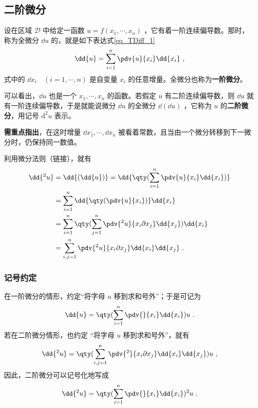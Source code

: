 \subsection{二阶微分}
设在区域 $\mathcal{D}$ 中给定一函数 $u=f(x_1,\cdots,x_n)$ ，它有着一阶连续偏导数。那时，称为全微分 $\dd{u}$ 的，就是如下表达式\autoref{eq_TDiff_1}~
\begin{equation}
\dd{u}=\sum_{i=1}^n \pdv{u}{x_i}\dd{x_i}~,
\end{equation}
式中的 $\dd{x_i}\quad(i=1,\cdots,n)$ 是自变量 $x_i$ 的任意增量。全微分也称为\textbf{一阶微分}。

可以看出，$\dd{u}$ 也是一个 $x_1,\cdots,x_n$ 的函数。若假定 $u$ 有二阶连续偏导数，则 $\dd{u}$ 就有一阶连续偏导数，于是就能说微分 $\dd{u}$ 的全微分 $\dd{(\dd u)}$ ，它称为 $u$ 的\textbf{二阶微分}，用记号 $\mathrm{d}^2u$ 表示。

\textbf{需重点指出}，在这时增量 $\dd{x_1},\cdots,\dd{x_n}$ 被看着常数，且当由一个微分转移到下一微分时，仍保持同一数值。

利用微分法则（链接），就有
\begin{equation}
\begin{aligned}
\dd{^2u}&=\dd{(\dd{u})}=\dd{\qty(\sum_{i=1}^n \pdv{u}{x_i}\dd{x_i})}\\
&=\sum_{i=1}^n \dd{\qty(\pdv{u}{x_i})}\dd{x_i}\\
&=\sum_{i=1}^n\qty(\sum_{j=1}^n\pdv{^2u}{x_i\partial x_j} \dd{x_j})\dd{x_i}\\
&=\sum_{i,j=1}^n\pdv{^2u}{x_i\partial x_j} \dd{x_i}\dd{x_j}~.
\end{aligned}
\end{equation}
\subsubsection{记号约定}
在一阶微分的情形，约定“将字母 $u$ 移到求和号外”；于是可记为
\begin{equation}
\dd{u}=\qty(\sum_{i=1}^n\pdv{}{x_i}\dd{x_i})u~.
\end{equation}
若在二阶微分情形，也约定 “将字母 $u$ 移到求和号外”，就有
\begin{equation}
\dd{^2u}=\qty(\sum_{i,j=1}^n\pdv{^2}{x_i\partial x_j} \dd{x_i}\dd{x_j})u~,
\end{equation}
因此，二阶微分可以记号化地写成
\begin{equation}
\dd{^2u}=\qty(\sum_{i=1}^n\pdv{}{x_i} \dd{x_i})^2u~.
\end{equation}
